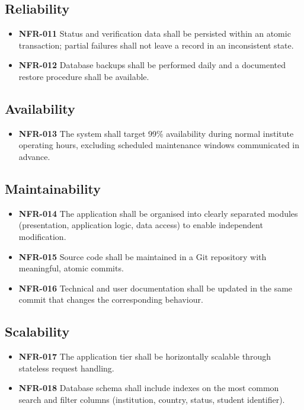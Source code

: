 \documentclass[11pt,a4paper]{article}
\begin{document}
\subsection{Reliability}
\begin{itemize}
  \item \textbf{NFR-011} Status and verification data shall be persisted within an atomic transaction; partial failures shall not leave a record in an inconsistent state.
  \item \textbf{NFR-012} Database backups shall be performed daily and a documented restore procedure shall be available.
\end{itemize}

\subsection{Availability}
\begin{itemize}
  \item \textbf{NFR-013} The system shall target 99\% availability during normal institute operating hours, excluding scheduled maintenance windows communicated in advance.
\end{itemize}

\subsection{Maintainability}
\begin{itemize}
  \item \textbf{NFR-014} The application shall be organised into clearly separated modules (presentation, application logic, data access) to enable independent modification.
  \item \textbf{NFR-015} Source code shall be maintained in a Git repository with meaningful, atomic commits.
  \item \textbf{NFR-016} Technical and user documentation shall be updated in the same commit that changes the corresponding behaviour.
\end{itemize}

\subsection{Scalability}
\begin{itemize}
  \item \textbf{NFR-017} The application tier shall be horizontally scalable through stateless request handling.
  \item \textbf{NFR-018} Database schema shall include indexes on the most common search and filter columns (institution, country, status, student identifier).
\end{itemize}
\end{document}
